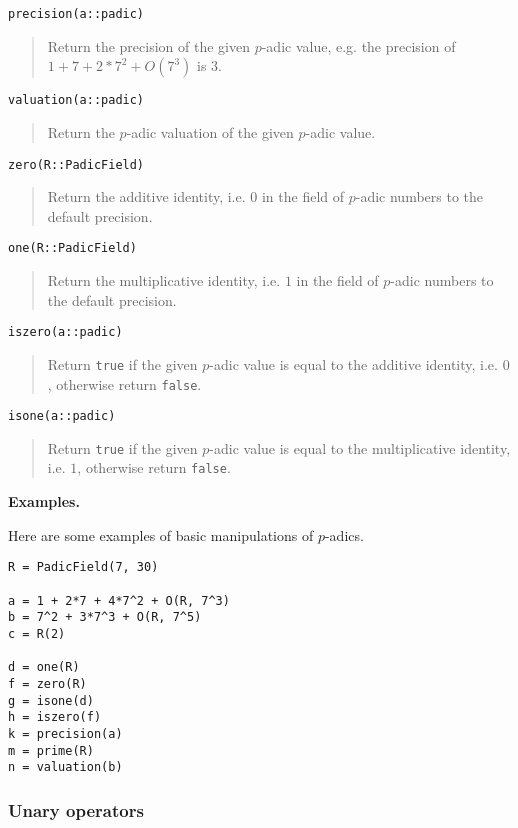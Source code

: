 \documentclass[a4paper,10pt]{article}
\newcommand{\code}{\lstinline}
\newcommand{\desc}[1]{\vspace{-3mm}\begin{quote}#1\end{quote}}
\begin{document}
{{\begin{lstlisting}
precision(a::padic)
\end{lstlisting}

\desc{Return the precision of the given $p$-adic value, e.g. the precision of
$1 + 7 + 2*7^2 + O(7^3)$ is $3$.}

\begin{lstlisting}
valuation(a::padic)
\end{lstlisting}

\desc{Return the $p$-adic valuation of the given $p$-adic value.}

\begin{lstlisting}
zero(R::PadicField)
\end{lstlisting}

\desc{Return the additive identity, i.e. $0$ in the field of $p$-adic
numbers to the default precision.}

\begin{lstlisting}
one(R::PadicField)
\end{lstlisting}

\desc{Return the multiplicative identity, i.e. $1$ in the field of
$p$-adic numbers to the default precision.}

\begin{lstlisting}
iszero(a::padic)
\end{lstlisting}

\desc{Return \code{true} if the given $p$-adic value is equal to the additive identity,
i.e. $0$, otherwise return \code{false}.}

\begin{lstlisting}
isone(a::padic)
\end{lstlisting}

\desc{Return \code{true} if the given $p$-adic value is equal to the multiplicative
identity, i.e. $1$, otherwise return \code{false}.}

\textbf{Examples.}

Here are some examples of basic manipulations of $p$-adics.

\begin{lstlisting}
R = PadicField(7, 30)

a = 1 + 2*7 + 4*7^2 + O(R, 7^3)
b = 7^2 + 3*7^3 + O(R, 7^5)
c = R(2)

d = one(R)
f = zero(R)
g = isone(d)
h = iszero(f)
k = precision(a)
m = prime(R)
n = valuation(b)
\end{lstlisting}

\subsubsection{Unary operators}

}}
\end{document}
